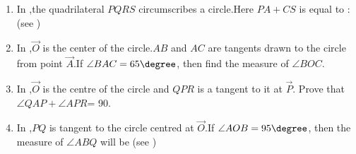 

\begin{enumerate}
	\item In ,the quadrilateral $PQRS$ circumscribes a circle.Here $PA+CS$ is equal to : (see ) 

\begin{figure}[H]
	        \centering
		
		\caption{}
		\label{fig.circle1}
\end{figure}



 \begin{table}[!ht]
	        \centering
	        
		\caption{}
		\label{tab:1}
 \end{table}




\item In ,$\vec{O}$ is the center of the circle.$AB$ and $AC$ are tangents drawn to the circle from point $\vec{ A}$.If $\angle BAC=65\degree$, then find the measure of $\angle BOC$.


	\begin{center}
\begin{figure}[H]
	        \centering
	        
		\caption{}
		\label{fig.circle2}
        \end{figure}
	\end{center}




\item In ,$\vec{ O}$ is the centre of the circle and $QPR$ is a tangent to it at $\vec{ P}$. Prove that $\angle QAP+ \angle APR$= 90\degree.
\begin{figure}[H]
	        \centering
	        
		\caption{}
		\label{fig.circle3}

        \end{figure}





\item In ,$PQ$ is tangent to the circle centred at $\vec{ O}$.If $\angle AOB= 95\degree$, then the measure of $\angle ABQ$ will be (see )
\begin{figure}[H]
	        \centering
	        
		\caption{}
		\label{fig.circle4}
        \end{figure}


\begin{table}[!ht]
	        \centering
	        
		\caption{}
		\label{tab:tab:2}
        \end{table}







\end{enumerate}
